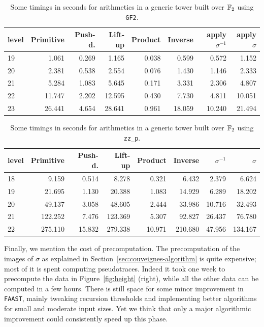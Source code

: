 \begin{table}
  \centering
  \begin{tabular}{l r r r r r r r}
    \hline
    \small level & \small Primitive & \small Push-d. & \small Lift-up & \small Product & \small Inverse & \small apply $\sigma^{-1}$ & \small apply $\sigma$ \\
    \hline
     19 &  1.061 & 0.269 &  1.165 & 0.038 &  0.599 &  0.572 &  1.152\\
     20 &  2.381 & 0.538 &  2.554 & 0.076 &  1.430 &  1.146 &  2.333\\
     21 &  5.284 & 1.083 &  5.645 & 0.171 &  3.331 &  2.306 &  4.807\\
     22 & 11.747 & 2.202 & 12.595 & 0.430 &  7.730 &  4.811 & 10.051\\
     23 & 26.441 & 4.654 & 28.641 & 0.961 & 18.059 & 10.240 & 21.494\\
  \end{tabular}
  \caption{Some timings in seconds for arithmetics in a generic tower built over $\mathbb{F}_2$ using \texttt{GF2}.}
  \label{tab:arith-gf2}
\end{table}

\begin{table}
  \centering
  \begin{tabular}{l r r r r r r r}
    \hline
    \small level & \small Primitive & \small Push-d. & \small Lift-up & \small Product & \small Inverse & \small $\sigma^{-1}$ & \small  $\sigma$ \\
    \hline
    18 &   9.159 &  0.514 &   8.278 &  0.321 &   6.432 &  2.379 &   6.624\\
    19 &  21.695 &  1.130 &  20.388 &  1.083 &  14.929 &  6.289 &  18.202\\
    20 &  49.137 &  3.058 &  48.605 &  2.444 &  33.986 & 10.716 &  32.493\\
    21 & 122.252 &  7.476 & 123.369 &  5.307 &  92.827 & 26.437 &  76.780\\
    22 & 275.110 & 15.832 & 279.338 & 10.971 & 210.680 & 47.956 & 134.167\\
  \end{tabular}
  \caption{Some timings in seconds for arithmetics in a generic tower built over $\mathbb{F}_2$ using \texttt{zz\_p}.}
  \label{tab:arith-zzp}
\end{table}


Finally, we mention the cost of precomputation. The precomputation of
the images of $\sigma$ as explained in
Section~\ref{sec:couveignes-algorithm} is quite expensive; most of it
is spent computing pseudotraces. Indeed it took one week to precompute
the data in Figure~\ref{fig:height} (right), while all the other data
can be computed in a few hours. There is still space for some minor
improvement in \texttt{FAAST}, mainly tweaking recursion thresholds
and implementing better algorithms for small and moderate input
sizes. Yet we think that only a major algorithmic improvement could
consistently speed up this phase.



%
